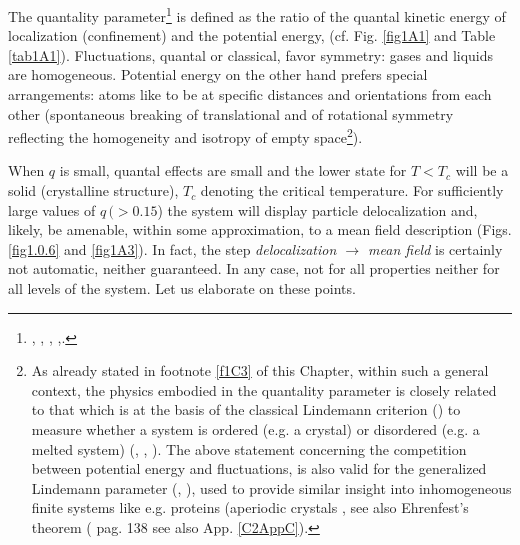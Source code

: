 The quantality parameter\footnote{\cite{Nosanow:76}, \cite{deBoer:57}, \cite{deBoer:48}, \cite{deBoer:48b},\cite{Mottelson:02}.} is defined as the ratio of the quantal kinetic energy of localization (confinement) and the potential energy, (cf. Fig. \ref{fig1A1} and Table \ref{tab1A1}).
 Fluctuations, quantal or classical, favor symmetry: gases and liquids are homogeneous. Potential energy on the other hand prefers special arrangements: atoms like to be at specific distances and orientations from each other (spontaneous breaking of translational and of rotational symmetry reflecting the homogeneity and isotropy of empty space\footnote{As already stated in footnote \ref{f1C3} of this Chapter, within such a  general context, the physics embodied in the quantality parameter is closely related to that which is at the basis of the classical Lindemann criterion (\cite{Lindemann:10}) to measure whether a system is ordered (e.g. a crystal) or disordered (e.g. a melted system) (\cite{Bilgram:87}, \cite{Lowen:94}, \cite{Stillinger:90,Stillinger:95}). The above statement concerning the competition between potential energy and fluctuations,  is also valid for the generalized Lindemann parameter (\cite{Stillinger:90}, \cite{Zhou:99}), used to provide similar insight into inhomogeneous finite systems like e.g. proteins (aperiodic crystals \cite{Schrodinger:44}, see also Ehrenfest's theorem (\cite{Basdevant:05} pag. 138 see also App. \ref{C2AppC}).}).
 
 
  When $q$ is small, quantal effects are small and the lower state for $T<T_c$ will be a solid  (crystalline structure), $T_c$ denoting the critical temperature.  For sufficiently large values of $q\, (>0.15$) the system will display particle delocalization and,  likely, be  amenable, within some approximation, to a mean field description (Figs. \ref{fig1.0.6} and   \ref{fig1A3}). In fact, the step \textit{delocalization $\rightarrow$ mean field} is certainly not automatic, neither guaranteed. In any case, not for all properties neither for all levels of the system. Let us elaborate on these points. 
  
